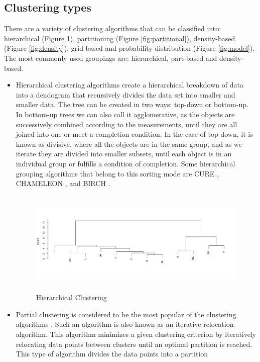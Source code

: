 \subsection*{Clustering types}

There are a variety of clustering algorithms that can be classified into: hierarchical (Figure \ref{fig:hierarchical}), partitioning (Figure \ref{fig:partitional}), density-based (Figure \ref{fig:density}), grid-based and probability distribution (Figure \ref{fig:model}). The most commonly used groupings are: hierarchical, part-based and density-based.
\\
\begin{itemize}
  \item Hierarchical clustering algorithms \cite{b19} create a hierarchical breakdown of data into a dendogram that recursively divides the data set into smaller and smaller data. The tree can be created in two ways: top-down or bottom-up. In bottom-up trees we can also call it agglomerative, as the objects are successively combined according to the measurements, until they are all joined into one or meet a completion condition.  In the case of top-down, it is known as divisive, where all the objects are in the same group, and as we iterate they are divided into smaller subsets, until each object is in an individual group or fulfills a condition of completion.
Some hierarchical grouping algorithms that belong to this sorting mode are CURE \cite{b20}, CHAMELEON \cite{b21}, and BIRCH \cite{b22}.
\begin{figure}[htbp]
  \centering
   \includegraphics[width=14cm, height=5cm]{img/hierarchical}
    \caption{Hierarchical Clustering}
    \label{fig:hierarchical}%
\end{figure}
  \item Partial clustering is considered to be the most popular of the clustering algorithms \cite{b23}. Such an algorithm is also known as an iterative relocation algorithm. This algorithm minimizes a given clustering criterion by iteratively relocating data points between clusters until an optimal partition is reached. This type of algorithm divides the data points into a partition

\end{itemize}
